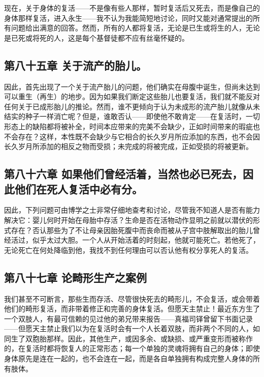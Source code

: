现在，关于身体的复活——不是像有些人那样，暂时复活后又死去，而是像自己的身体那样复活，进入永生——我不认为我能简短地讨论，同时又能对通常提出的所有问题给出满意的回答。然而，所有的人都将复活，无论是已生或将生的人，无论是已死或将死的人，这是每个基督徒都不应有丝毫怀疑的。\par


\subsection{第八十五章 关于流产的胎儿。}

因此，首先出现了一个关于流产胎儿的问题，他们确实在母腹中诞生，但尚未达到可以重生（再生）的地步。因为如果我们断定这些胎儿也要复活，我们就不能反对任何关于已成形胎儿的推论。然而，谁不更倾向于认为未成形的流产胎儿就像从未结实的种子一样消亡呢？但是，谁敢否认——即使他不敢肯定——在复活时，一切形态上的缺陷都将被补全，时间本应带来的完美不会缺少，正如时间带来的瑕疵也不会存在？这样，本性既不会缺少与它相合的长久岁月所应添加的东西，也不会因长久岁月所添加的相反之物而受损；未完成的将被完成，正如受损的将被更新。\par


\subsection{第八十六章 如果他们曾经活着，当然也必已死去，因此他们在死人复活中必有分。}

因此，下列问题可由博学之士非常仔细地查考和讨论，尽管我不知道人是否有能力解决它：婴儿何时开始在母胎中存活？生命是否在活物动作显明之前就以潜伏的形式存在？否认那些为了不让母亲因胎死腹中而丧命而被从子宫中肢解取出的胎儿曾经活过，似乎太过大胆。一个人从开始活着的时刻起，他就可能死亡。若他死了，无论死亡在何处降临到他，我找不到任何理由可以否认他有权分享死人的复活。\par


\subsection{第八十七章 论畸形生产之案例}

我们甚至不可断言，那些生而存活、尽管很快死去的畸形儿，不会复活，或会带着他们的畸形复活，而非带着修正和完善的身体复活。但愿天主禁止！最近东方生了一个双肢人，有最可信赖的见过他的弟兄带来报告——真福司铎曾留下书面记录——但愿天主禁止我们以为在复活时会有一个人长着双肢，而非两个不同的人，如同生了双胞胎那样。因此，其他生产，或因多余、或缺损、或严重变形而被称作的，在复活时都将恢复人的正常形态；每一个单独的灵魂将拥有自己的身体；即使身体原先是连在一起的，也不会连在一起，而是各自单独拥有构成完整人身体的所有肢体。\par


